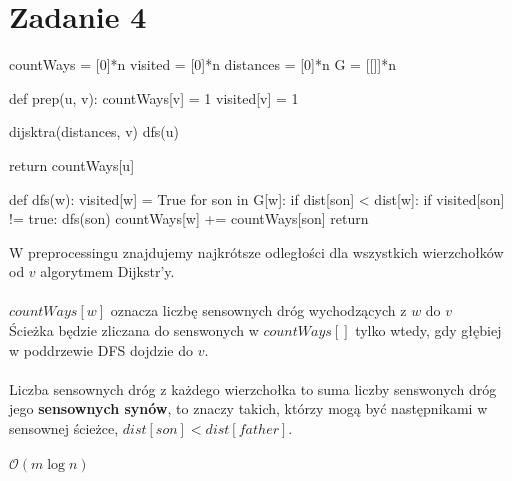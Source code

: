 \documentclass{article}
\begin{document}
\section{Zadanie 4}
\begin{python}
countWays = [0]*n
visited = [0]*n
distances = [0]*n
G = [[]]*n


def prep(u, v):
    countWays[v] = 1
    visited[v] = 1

    dijsktra(distances, v)
    dfs(u)

    return countWays[u]


def dfs(w):
    visited[w] = True
    for son in G[w]:
        if dist[son] < dist[w]:
            if visited[son] != true:
                dfs(son)
            countWays[w] += countWays[son]
    return
\end{python}
W preprocessingu znajdujemy najkrótsze odległości dla wszystkich wierzchołków od $v$ algorytmem Dijkstr'y.\\\\
$countWays[w]$ oznacza liczbę sensownych dróg wychodzących z $w$ do $v$\\
Ścieżka będzie zliczana do senswonych w $countWays[]$ tylko wtedy, gdy głębiej w poddrzewie DFS dojdzie do $v$.\\\\
Liczba sensownych dróg z każdego wierzchołka to suma liczby senswonych dróg jego \textbf{sensownych synów}, to znaczy takich, którzy mogą być następnikami w sensownej ścieżce, $dist[son] < dist[father]$.\\\\
$\mathcal{O}(m\log{n})$
\clearpage
\end{document}
